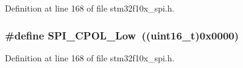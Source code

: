 Definition at line 168 of file stm32f10x\+\_\+spi.\+h.

\subsubsection[{\texorpdfstring{S\+P\+I\+\_\+\+C\+P\+O\+L\+\_\+\+Low}{SPI_CPOL_Low}}]{\setlength{\rightskip}{0pt plus 5cm}\#define S\+P\+I\+\_\+\+C\+P\+O\+L\+\_\+\+Low~(({\bf uint16\+\_\+t})0x0000)}\hypertarget{group___s_p_i___clock___polarity_ga3dbc0234c4b4e7c37137e7c189f3c085}{}\label{group___s_p_i___clock___polarity_ga3dbc0234c4b4e7c37137e7c189f3c085}


Definition at line 168 of file stm32f10x\+\_\+spi.\+h.

